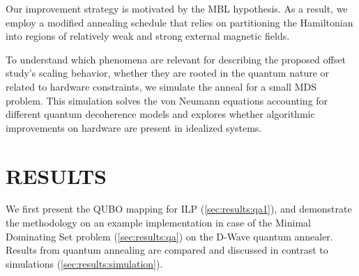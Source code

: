 \documentclass[10pt]{iopart}
\begin{document}
Our improvement strategy is motivated by the MBL hypothesis.
As a result, we employ a modified annealing schedule that relies on partitioning the Hamiltonian into regions of relatively weak and strong external magnetic fields.


To understand which phenomena are relevant for describing the proposed offset study's scaling behavior, whether they are rooted in the quantum nature or related to hardware constraints, we simulate the anneal for a small MDS problem. This simulation solves the von Neumann equations accounting for different quantum decoherence models and explores whether algorithmic improvements on hardware are present in idealized systems.

\section{RESULTS}
\label{sec:results}

We first present the QUBO mapping for ILP (\ref{sec:results:qa1}), and demonstrate the methodology on an example implementation in case of the Minimal Dominating Set problem (\ref{sec:results:qa}) on the D-Wave quantum annealer. Results from quantum annealing are compared and discussed in contrast to simulations (\ref{sec:results:simulation}).

\end{document}

